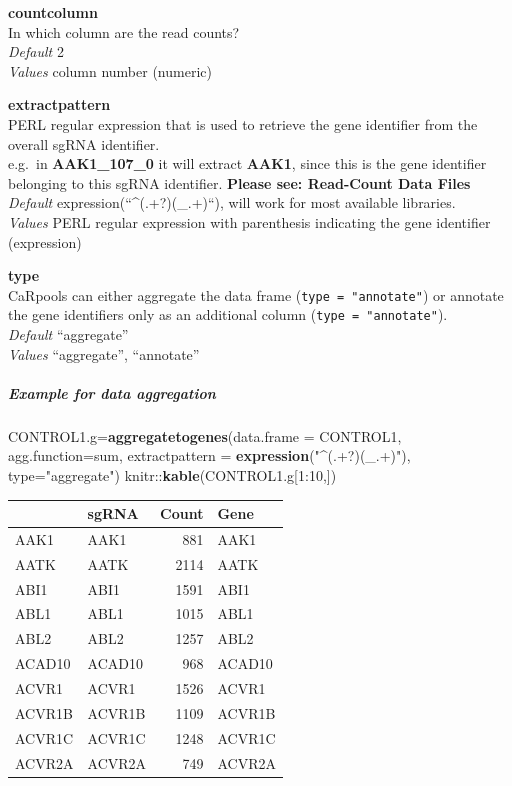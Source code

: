 \documentclass[]{article}
\newenvironment{Shaded}{\begin{snugshade}}{\end{snugshade}}
\newcommand{\KeywordTok}[1]{\textcolor[rgb]{0.13,0.29,0.53}{\textbf{{#1}}}}
\newcommand{\DataTypeTok}[1]{\textcolor[rgb]{0.13,0.29,0.53}{{#1}}}
\newcommand{\DecValTok}[1]{\textcolor[rgb]{0.00,0.00,0.81}{{#1}}}
\newcommand{\StringTok}[1]{\textcolor[rgb]{0.31,0.60,0.02}{{#1}}}
\newcommand{\NormalTok}[1]{{#1}}
\let\oldsubparagraph\subparagraph
\renewcommand{\subparagraph}[1]{\oldsubparagraph{#1}\mbox{}}
\begin{document}
\textbf{countcolumn}\\
In which column are the read counts?\\
\emph{Default} 2\\
\emph{Values} column number (numeric)

\textbf{extractpattern}\\
PERL regular expression that is used to retrieve the gene identifier
from the overall sgRNA identifier.\\
e.g.~in \textbf{AAK1\_107\_0} it will extract \textbf{AAK1}, since this
is the gene identifier belonging to this sgRNA identifier.
\textbf{Please see: Read-Count Data Files}\\
\emph{Default} expression(``\^{}(.+?)(\_.+)``), will work for most
available libraries.\\
\emph{Values} PERL regular expression with parenthesis indicating the
gene identifier (expression)

\textbf{type}\\
CaRpools can either aggregate the data frame
(\texttt{type\ =\ "annotate"}) or annotate the gene identifiers only as
an additional column (\texttt{type\ =\ "annotate"}).\\
\emph{Default} ``aggregate''\\
\emph{Values} ``aggregate'', ``annotate''

\subparagraph{Example for data
aggregation}\label{example-for-data-aggregation}

\begin{Shaded}
\begin{Highlighting}[]
\NormalTok{CONTROL1.g=}\KeywordTok{aggregatetogenes}\NormalTok{(}\DataTypeTok{data.frame =} \NormalTok{CONTROL1, }\DataTypeTok{agg.function=}\NormalTok{sum,}
            \DataTypeTok{extractpattern =} \KeywordTok{expression}\NormalTok{(}\StringTok{"^(.+?)(_.+)"}\NormalTok{), }\DataTypeTok{type=}\StringTok{"aggregate"}\NormalTok{)}
\NormalTok{knitr::}\KeywordTok{kable}\NormalTok{(CONTROL1.g[}\DecValTok{1}\NormalTok{:}\DecValTok{10}\NormalTok{,])}
\end{Highlighting}
\end{Shaded}

\begin{longtable}[c]{@{}llrl@{}}
\toprule
& sgRNA & Count & Gene\tabularnewline
\midrule
\endhead
AAK1 & AAK1 & 881 & AAK1\tabularnewline
AATK & AATK & 2114 & AATK\tabularnewline
ABI1 & ABI1 & 1591 & ABI1\tabularnewline
ABL1 & ABL1 & 1015 & ABL1\tabularnewline
ABL2 & ABL2 & 1257 & ABL2\tabularnewline
ACAD10 & ACAD10 & 968 & ACAD10\tabularnewline
ACVR1 & ACVR1 & 1526 & ACVR1\tabularnewline
ACVR1B & ACVR1B & 1109 & ACVR1B\tabularnewline
ACVR1C & ACVR1C & 1248 & ACVR1C\tabularnewline
ACVR2A & ACVR2A & 749 & ACVR2A\tabularnewline
\bottomrule
\end{longtable}
\end{document}
